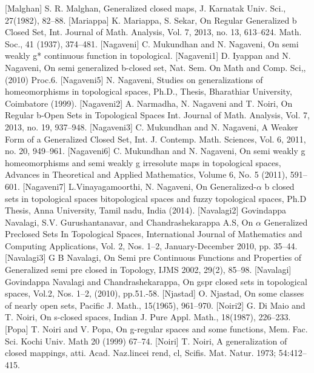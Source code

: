 \begin{thebibliography}{99}
 [Malghan] S. R. Malghan, Generalized closed maps, J. Karnatak Univ. Sci., 27(1982), 82--88.
 [Mariappa] K. Mariappa, S. Sekar, On Regular Generalized b Closed Set, Int. Journal of Math. Analysis, 	Vol. 7, 2013, no. 13, 613--624. Math. Soc., 41 (1937), 374--481.
 [Nagaveni] C. Mukundhan and N. Nagaveni, On semi weakly g* continuous function in topological. 
 [Nagaveni1] D. Iyappan and N. Nagaveni, On semi generalized b-closed set, Nat. Sem. On Math and Comp. Sci,, (2010) Proc.6.
 [Nagaveni5] N. Nagaveni, Studies on generalizations of homeomorphisms in topological spaces, Ph.D., Thesis, Bharathiar University, Coimbatore (1999).
 [Nagaveni2] A. Narmadha, N. Nagaveni and T. Noiri, On Regular b-Open Sets in Topological Spaces Int. Journal of Math. Analysis, Vol. 7, 2013, no. 19, 937--948.
 [Nagaveni3] C. Mukundhan and N. Nagaveni, A Weaker Form of a Generalized Closed Set, Int. J. Contemp. Math. Sciences, Vol. 6, 2011, no. 20, 949--961.
 [Nagaveni6] C. Mukundhan and N. Nagaveni, On semi weakly g homeomorphisms and semi weakly g irresolute maps in topological spaces, Advances in Theoretical and Applied Mathematics, Volume 6, No. 5 (2011), 591--601.
 [Nagaveni7] L.Vinayagamoorthi, N. Nagaveni, On Generalized-$\alpha$ b closed sets in topological spaces bitopological spaces and fuzzy topological spaces, Ph.D Thesis, Anna University, Tamil nadu, India (2014).
 [Navalagi2] Govindappa Navalagi, S.V. Gurushantanavar, and Chandrashekarappa A.S,  On $\alpha$ Generalized Preclosed Sets In Topological Spaces, International Journal of Mathematics and Computing Applications, Vol. 2, Nos. 1--2, January-December 2010, pp. 35--44.
 [Navalagi3] G B Navalagi, On Semi pre Continuous Functions and Properties of Generalized semi pre closed in Topology, IJMS 2002, 29(2), 85--98.
 [Navalagi] Govindappa Navalagi and Chandrashekarappa, On gspr closed sets in topological spaces, Vol.2, Nos. 1--2, (2010), pp.51.-58.
 [Njastad] O. Njastad, On some classes of nearly open sets,  Pacific J. Math., 15(1965), 961--970.
 [Noiri2] G. Di Maio and T. Noiri, On s-closed spaces, Indian J. Pure Appl. Math., 18(1987), 226--233.
 [Popa] T. Noiri and V. Popa, On g-regular spaces and some functions, Mem. Fac. Sci. Kochi Univ. Math 20 (1999) 67--74.
 [Noiri] T. Noiri, A generalization of closed mappings, atti. Acad. Naz.lincei rend, cl, Scifis. Mat. Natur. 1973; 54:412--415.

\end{thebibliography}
